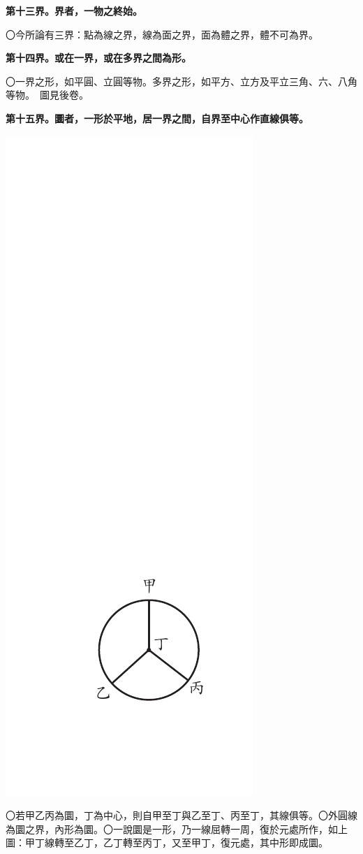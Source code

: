 \documentclass[12pt,b5paper,landscape]{article}
\newcommand{\bcom}[1]{〇#1}
\newcommand{\cthm}[1]{{
\vspace{8pt}

\bfseries #1}}
\begin{document}
\begin{multicols}{2}
\cthm{第十三界。界者，一物之終始。}\bcom{今所論有三界：點為線之界，線為面之界，面為體之界，體不可為界。}

\cthm{第十四界。或在一界，或在多界之間為形。}\bcom{一界之形，如平圓、立圓等物。多界之形，如平方、立方及平立三角、六、八角等物。　圖見後卷。}

\cthm{第十五界。圜者，一形於平地，居一界之間，自界至中心作直線俱等。}
\begin{center}
\includegraphics[angle=90]{eu12}
\end{center}
\bcom{若甲乙丙為圜，丁為中心，則自甲至丁與乙至丁、丙至丁，其線俱等。}\bcom{外圓線為圜之界，內形為圜。}\bcom{一說圜是一形，乃一線屈轉一周，復於元處所作，如上圖：甲丁線轉至乙丁，乙丁轉至丙丁，又至甲丁，復元處，其中形即成圜。}


\end{multicols}
\end{document}
